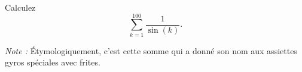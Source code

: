 \begin{exercice}\label{exoMatlab0002}

Calculez \[ \sum_{k=1}^{100}\frac{1}{ \sin(k) } . \]

\emph{Note :} Étymologiquement, c'est cette somme qui a donné son nom aux assiettes gyros spéciales avec frites.

\end{exercice}

